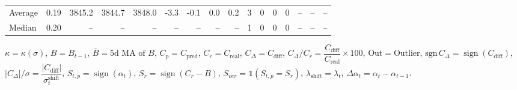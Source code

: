 \begin{threeparttable}
{\begin{tabular}{lrrrrrrrrrrrrrrr}
Average &     0.19 & 3845.2 & 3844.7 & 3848.0 &       -3.3 &           -0.1 &                      0.0 &                 0.2 &              3 &         0 &     0 &         0 &         -- &        -- &             -- \\
 Median &     0.20 &     -- &     -- &     -- &         -- &             -- &                       -- &                  -- &              1 &         0 &     0 &         0 &         -- &        -- &             -- \\
\bottomrule
\end{tabular}
}
\begin{tablenotes}\footnotesize
\item $\kappa=\kappa(\sigma)$, $B=B_{t-1}$, $\overline{B}=\text{5d MA of }B$, $C_p=C_{\text{pred}}$, $C_r=C_{\text{real}}$, $C_\Delta=C_{\text{diff}}$, $C_\Delta/C_r=\dfrac{C_{\text{diff}}}{C_{\text{real}}}\times100$, $\mathrm{Out}=\text{Outlier}$, $\mathrm{sgn}\,C_\Delta=\operatorname{sign}(C_{\text{diff}})$, $|C_\Delta|/\sigma=\dfrac{|C_{\text{diff}}|}{\sigma_t^{\text{shift}}}$, $S_{t,p}=\operatorname{sign}(\alpha_t)$, $S_r=\operatorname{sign}(C_r - B)$, $S_{ver}=\mathbb{1}(S_{t,p}=S_r)$, $\lambda_{\text{shift}}=\lambda_t$, $\Delta\alpha_t=\alpha_t-\alpha_{t-1}$.\end{tablenotes}
\end{threeparttable}
\endgroup

